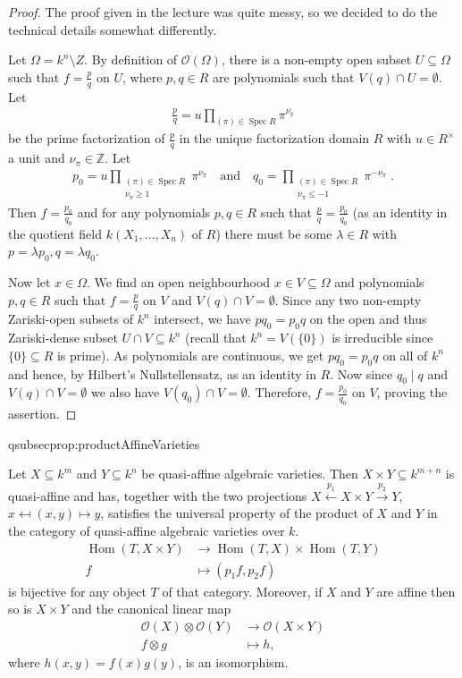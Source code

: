 \documentclass[DIV=14,parskip=full,pointednumbers]{scrartcl}
\theoremstyle{cthm}
\theoremstyle{cvarthm}
\theoremstyle{cdef}
\newcommand{\lbl}[1]{
	\label{#1}
	\ifmmode
	\expandafter\xdef\csname eqsubsec#1\endcsname{\thesubsection}
	\fi
}
\newcommand{\Oo}{\mathcal{O}}
\newcommand{\IZ}{\mathbb{Z}}
\newcommand{\Hom}{\operatorname{Hom}}
\newcommand{\Spec}{\operatorname{Spec}}
\newcommand{\longto}{\longrightarrow}
\newcommand{\longot}{\longleftarrow}
\newcommand{\morphism}[1][]{\overset{#1}{\longto}}
\begin{document}
	\begin{proof} 
		The proof given in the lecture was quite messy, so we decided to do the technical details somewhat differently.
		
		Let $\Omega= k^n\setminus Z$. By definition of $\Oo(\Omega)$, there is a non-empty open subset $U\subseteq\Omega$ such that $f=\frac pq$ on $U$, where $p,q\in R$ are polynomials such that $V(q)\cap U=\emptyset$. Let
		\begin{align*}
			\frac pq=u\prod_{(\pi)\in\Spec R} \pi^{\nu_\pi}
		\end{align*}
		be the prime factorization of $\frac pq$ in the unique factorization domain $R$ with $u\in R^\times$ a unit and $\nu_\pi\in\IZ$. Let
		\begin{align*}
			p_0=u\prod_{\substack{(\pi)\in\Spec R\\\nu_\pi\geq 1}}\pi^{\nu_\pi}\quad\text{and}\quad q_0=\prod_{\substack{(\pi)\in\Spec R\\\nu_\pi\leq -1}}\pi^{-\nu_\pi}\;.
		\end{align*}
		Then $f=\frac{p_0}{q_0}$ and for any polynomials $p,q\in R$ such that $\frac pq=\frac{p_0}{q_0}$ (as an identity in the quotient field $k(X_1,\ldots,X_n)$ of $R$) there must be some $\lambda\in R$ with $p=\lambda p_0,q=\lambda q_0$.
		
		Now let $x\in\Omega$. We find an open neighbourhood $x\in V\subseteq \Omega$ and polynomials $p,q\in R$ such that $f=\frac pq$ on $V$ and $V(q)\cap V=\emptyset$. Since any two non-empty Zariski-open subsets of $k^n$ intersect, we have $pq_0=p_0q$ on the open and thus Zariski-dense subset $U\cap V\subseteq k^n$ (recall that $k^n=V\left(\{0\}\right)$ is irreducible since $\{0\}\subseteq R$ is prime). As polynomials are continuous, we get $pq_0=p_0q$ on all of $k^n$ and hence, by Hilbert's Nullstellensatz, as an identity in $R$. Now since $q_0\mid q$ and $V(q)\cap V=\emptyset$ we also have $V(q_0)\cap V=\emptyset$. Therefore, $f=\frac{p_0}{q_0}$ on $V$, proving the assertion.
	\end{proof}
	\begin{prop}\lbl{prop:productAffineVarieties}
		Let $X\subseteq k^m$ and $Y\subseteq k^n$ be quasi-affine algebraic varieties. Then $X\times Y \subseteq k^{m+n}$ is quasi-affine and has, together with the two projections $X\overset{p_1}{\longot} X\times Y \morphism[p_2] Y$, $x \mapsfrom (x,y) \mapsto y$, satisfies the universal property of the product of $X$ and $Y$ in the category of quasi-affine algebraic varieties over $k$.
		\begin{align*}
			\Hom(T, X\times Y) &\longto \Hom(T,X)\times \Hom(T,Y)\\
			f &\longmapsto (p_1f, p_2f)
		\end{align*}
		is bijective for any object $T$ of that category.
		Moreover, if $X$ and $Y$ are affine then so is $X\times Y$ and the canonical linear map
		\begin{align*}
			\Oo(X)\otimes \Oo(Y) &\longto\Oo(X\times Y)\\
			f\otimes g &\longmapsto h,
		\end{align*}
		where $h(x,y) = f(x)g(y)$, is an isomorphism.
	\end{prop}
\end{document}
